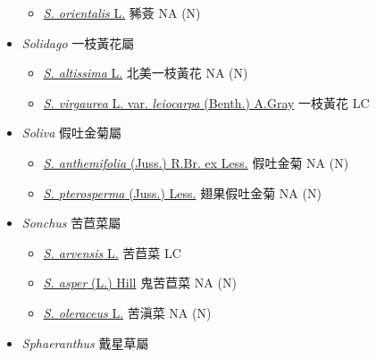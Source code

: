 \begin{itemize}
  \begin{itemize}
        \item[] \href{http://www.theplantlist.org/tpl1.1/search?q=Sigesbeckia+orientalis}{\textit{S. orientalis} L.}   豨薟   NA (N)
  \end{itemize}
 \item[] \textit{Solidago} 一枝黃花屬
                                
  \begin{itemize}
        \item[] \href{http://www.theplantlist.org/tpl1.1/search?q=Solidago+altissima}{\textit{S. altissima} L.}   北美一枝黃花   NA (N)
        \item[] \href{http://www.theplantlist.org/tpl1.1/search?q=Solidago+virgaurea+var.+leiocarpa}{\textit{S. virgaurea} L. var. \textit{leiocarpa} (Benth.) A.Gray}   一枝黃花   LC
  \end{itemize}
 \item[] \textit{Soliva} 假吐金菊屬
                                
  \begin{itemize}
        \item[] \href{http://www.theplantlist.org/tpl1.1/search?q=Soliva+anthemifolia}{\textit{S. anthemifolia} (Juss.) R.Br. ex Less.}   假吐金菊   NA (N)
        \item[] \href{http://www.theplantlist.org/tpl1.1/search?q=Soliva+pterosperma}{\textit{S. pterosperma} (Juss.) Less.}   翅果假吐金菊   NA (N)
  \end{itemize}
 \item[] \textit{Sonchus} 苦苣菜屬
                                
  \begin{itemize}
        \item[] \href{http://www.theplantlist.org/tpl1.1/search?q=Sonchus+arvensis}{\textit{S. arvensis} L.}   苦苣菜   LC
        \item[] \href{http://www.theplantlist.org/tpl1.1/search?q=Sonchus+asper}{\textit{S. asper} (L.) Hill}   鬼苦苣菜   NA (N)
        \item[] \href{http://www.theplantlist.org/tpl1.1/search?q=Sonchus+oleraceus}{\textit{S. oleraceus} L.}   苦滇菜   NA (N)
  \end{itemize}
 \item[] \textit{Sphaeranthus} 戴星草屬
                                

\end{itemize}
